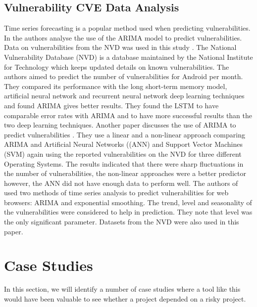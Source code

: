\documentclass[conference]{IEEEtran}
\begin{document}
\subsection{Vulnerability CVE Data Analysis}
Time series forecasting is a popular method used when predicting vulnerabilities. In \cite{gencer_time_2021} the authors analyse the use of the ARIMA model to predict vulnerabilities. Data on vulnerabilities from the NVD was used in this study \cite{noauthor_vulnerability_nodate}. The National Vulnerability Database (NVD) is a database maintained by the National Institute for Technology which keeps updated details on known vulnerabilities. The authors aimed to predict the number of vulnerabilities for Android per month. They compared its performance with the long short-term memory model, artificial neural network and recurrent neural network deep learning techniques and found ARIMA gives better results. They found the LSTM to have comparable error rates with ARIMA and to have more successful results than the two deep learning techniques. Another paper discusses the use of ARIMA to predict vulnerabilities \cite{pokhrel_cybersecurity_2017}. They use a linear and a non-linear approach comparing ARIMA and Artificial Neural Networks ((ANN) and Support Vector Machines (SVM) again using the reported vulnerabilities on the NVD for three different Operating Systems. The results indicated that there were sharp fluctuations in the number of vulnerabilities, the non-linear approaches were a better predictor however, the ANN did not have enough data to perform well. The authors of \cite{roumani_time_2015} used two methods of time series analysis to predict vulnerabilities for web browsers: ARIMA and exponential smoothing. The trend, level and seasonality of the vulnerabilities were considered to help in prediction. They note that level was the only significant parameter. Datasets from the NVD were also used in this paper.

\section{Case Studies}
In this section, we will identify a number of case studies where a tool like this would have been valuable to see whether a project depended on a risky project. 
\end{document}
